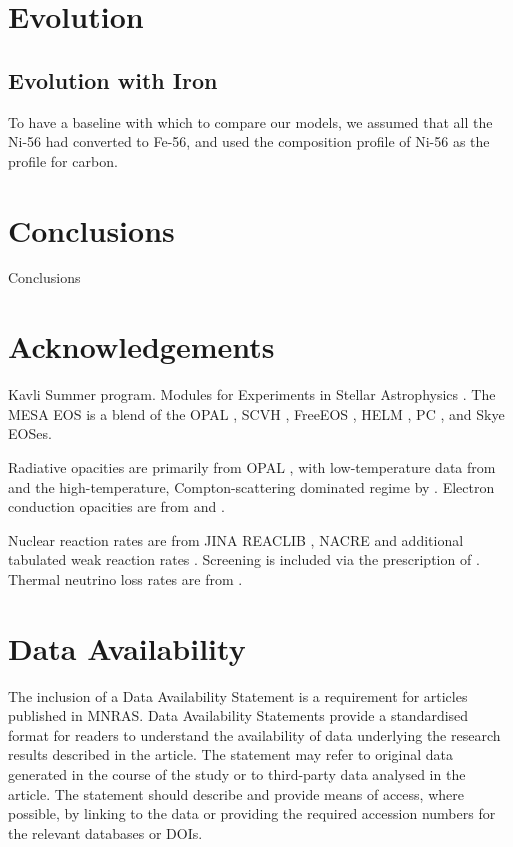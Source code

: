 \documentclass[fleqn,usenatbib]{mnras}
\begin{document}
\section{Evolution}

\subsection{Evolution with Iron}

To have a baseline with which to compare our models, we assumed that all the Ni-56 had converted to Fe-56, and used the composition profile of Ni-56 as the profile for carbon. 


\section{Conclusions}

Conclusions

\section*{Acknowledgements}

Kavli Summer program. Modules for Experiments in Stellar Astrophysics
\citep[MESA][]{Paxton2011, Paxton2013, Paxton2015, Paxton2018, Paxton2019, Jermyn2023}. The MESA EOS is a blend of the OPAL \citep{Rogers2002}, SCVH
\citep{Saumon1995}, FreeEOS \citep{Irwin2004}, HELM \citep{Timmes2000},
PC \citep{Potekhin2010}, and Skye \citep{Jermyn2021} EOSes.

Radiative opacities are primarily from OPAL \citep{Iglesias1993,
Iglesias1996}, with low-temperature data from \citet{Ferguson2005}
and the high-temperature, Compton-scattering dominated regime by
\citet{Poutanen2017}.  Electron conduction opacities are from
\citet{Cassisi2007} and \citet{Blouin2020}.

Nuclear reaction rates are from JINA REACLIB \citep{Cyburt2010}, NACRE \citep{Angulo1999} and
additional tabulated weak reaction rates \citet{Fuller1985, Oda1994,
Langanke2000}.  Screening is included via the prescription of \citet{Chugunov2007}.
Thermal neutrino loss rates are from \citet{Itoh1996}.

\section*{Data Availability}

 
The inclusion of a Data Availability Statement is a requirement for articles published in MNRAS. Data Availability Statements provide a standardised format for readers to understand the availability of data underlying the research results described in the article. The statement may refer to original data generated in the course of the study or to third-party data analysed in the article. The statement should describe and provide means of access, where possible, by linking to the data or providing the required accession numbers for the relevant databases or DOIs.
\end{document}
